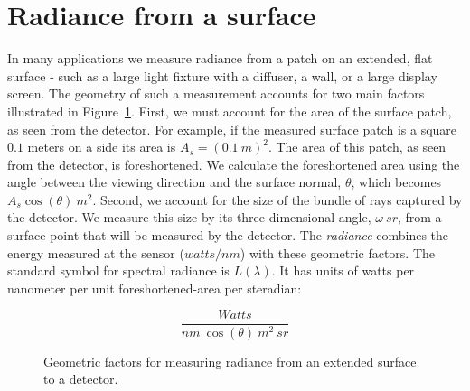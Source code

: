 \documentclass[
  letterpaper,
]{book}
\begin{document}
\section{Radiance from a surface}\label{radiance-from-a-surface}

In many applications we measure radiance from a patch on an extended,
flat surface - such as a large light fixture with a diffuser, a wall, or
a large display screen. The geometry of such a measurement accounts for
two main factors illustrated in Figure~\ref{fig-foreshortening-sketch}.
First, we must account for the area of the surface patch, as seen from
the detector. For example, if the measured surface patch is a square
\(0.1\) meters on a side its area is \(A_s = (0.1~m)^2\). The area of
this patch, as seen from the detector, is foreshortened. We calculate
the foreshortened area using the angle between the viewing direction and
the surface normal, \(\theta\), which becomes
\(A_s \cos(\theta) ~ m^2\). Second, we account for the size of the
bundle of rays captured by the detector. We measure this size by its
three-dimensional angle, \(\omega ~ sr\), from a surface point that will
be measured by the detector. The \emph{radiance} combines the energy
measured at the sensor (\(watts/nm\)) with these geometric factors. The
standard symbol for spectral radiance is \(L(\lambda)\). It has units of
watts per nanometer per unit foreshortened-area per steradian:

\[ 
\frac{Watts}{nm ~ \cos(\theta) ~ m^2 ~ sr}
\]

\begin{figure}


\caption{\label{fig-foreshortening-sketch}Geometric factors for
measuring radiance from an extended surface to a detector.}

\end{figure}%
\end{document}

